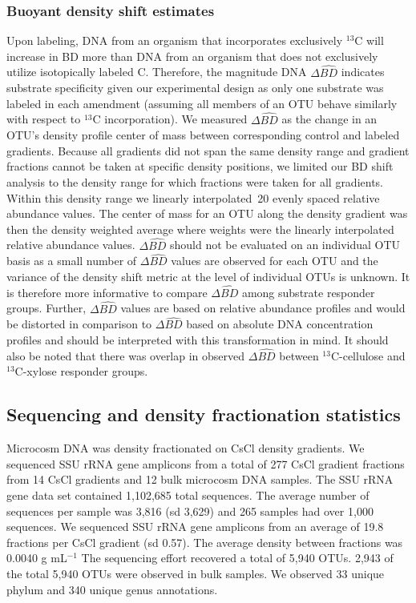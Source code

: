 \documentclass{article}
\begin{document}
\subsubsection{Buoyant density shift estimates}
Upon labeling, DNA from an organism that incorporates exclusively $^{13}$C will
increase in BD more than DNA from an organism that does not exclusively utilize
isotopically labeled C. Therefore, the magnitude DNA $\Delta\hat{BD}$ indicates
substrate specificity given our experimental design as only one substrate was
labeled in each amendment (assuming all members of an OTU behave similarly with
respect to $^{13}$C incorporation). We measured $\Delta\hat{BD}$ as the change in
an OTU's density profile center of mass between corresponding control and
labeled gradients. Because all gradients did not span the same density range
and gradient fractions cannot be taken at specific density positions, we
limited our BD shift analysis to the density range for which fractions were
taken for all gradients. Within this density range we linearly interpolated~20
evenly spaced relative abundance values. The center of mass for an OTU along
the density gradient was then the density weighted average where weights were
the linearly interpolated relative abundance values. $\Delta\hat{BD}$ should
not be evaluated on an individual OTU basis as a small number of
$\Delta\hat{BD}$ values are observed for each OTU and the variance of the
density shift metric at the level of individual OTUs is unknown. It is
therefore more informative to compare $\Delta\hat{BD}$ among substrate
responder groups. Further, $\Delta\hat{BD}$ values are based on relative
abundance profiles and would be distorted in comparison to $\Delta\hat{BD}$
based on absolute DNA concentration profiles and should be interpreted with
this transformation in mind. It should also be noted that there was overlap in
observed $\Delta\hat{BD}$ between $^{13}$C-cellulose and $^{13}$C-xylose
responder groups. 

\subsection{Sequencing and density fractionation statistics}\label{seq_stats}
Microcosm DNA was density fractionated on CsCl density gradients. We sequenced
SSU rRNA gene amplicons from a total of 277 CsCl gradient fractions from 14
CsCl gradients and 12 bulk microcosm DNA samples. The SSU rRNA gene data set
contained 1,102,685 total sequences. The average number of sequences per sample
was 3,816 (sd 3,629) and 265 samples had over 1,000 sequences. We sequenced SSU
rRNA gene amplicons from an average of 19.8 fractions per CsCl gradient (sd
0.57). The average density between fractions was  0.0040 g mL$^{-1}$ The
sequencing effort recovered a total of 5,940 OTUs. 2,943 of the total 5,940
OTUs were observed in bulk samples. We observed 33 unique phylum and 340 unique
genus annotations.


\end{document}

